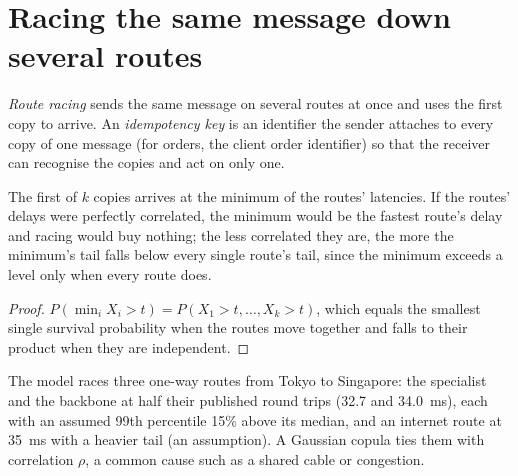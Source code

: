 \section{Racing the same message down several routes}

\begin{definition}\label{def:nw:cross-region-crypto-networks:idem}
\emph{Route racing} sends the same message on several routes at once and uses the first copy to arrive. An \emph{idempotency
key} is an identifier the sender attaches to every copy of one message (for orders, the client order identifier) so that the
receiver can recognise the copies and act on only one.
\end{definition}

\begin{proposition}\label{prop:nw:cross-region-crypto-networks:race}
The first of $k$ copies arrives at the minimum of the routes' latencies. If the routes' delays were perfectly correlated, the minimum would be the
fastest route's delay and racing would buy nothing; the less correlated they are, the more the minimum's tail falls below every single route's
tail, since the minimum exceeds a level only when every route does.
\end{proposition}

\begin{proof}
$P(\min_i X_i > t) = P(X_1 > t, \dots, X_k > t)$, which equals the smallest single survival probability when the routes move together and falls to
their product when they are independent.
\end{proof}

The model races three one-way routes from Tokyo to Singapore: the specialist and the backbone at half their published round trips (32.7 and
\qty{34.0}{\milli\second}), each with an assumed 99th percentile 15\% above its median, and an internet route at \qty{35}{\milli\second} with a
heavier tail (an assumption). A Gaussian copula ties them with correlation $\rho$, a common cause such as a shared cable or congestion.


